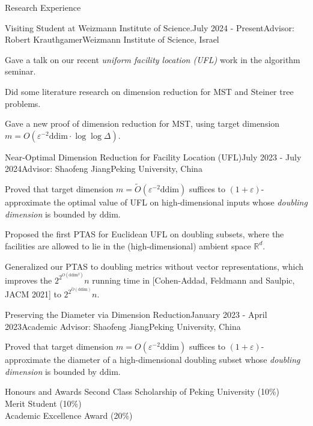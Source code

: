 \documentclass{resume} %
\begin{document}
\begin{rSection}{Research Experience}{}
    \begin{rSubsection}{Visiting Student at Weizmann Institute of Science.}{July 2024 - Present}{Advisor: Robert Krauthgamer}{Weizmann Institute of Science, Israel}
        \item Gave a talk on our recent \emph{uniform facility location (UFL)} work in the algorithm seminar.
        \item Did some literature research on dimension reduction for MST and Steiner tree problems.
        \item Gave a new proof of dimension reduction for MST, using target dimension $m = O(\varepsilon^{-2} \mathrm{ddim} \cdot \log\log \Delta)$.
    \end{rSubsection}

    \begin{rSubsection}{Near-Optimal Dimension Reduction for Facility Location (UFL)}{July 2023 - July 2024}{Advisor: Shaofeng Jiang}{Peking University, China}
       \item Proved that target dimension $m = \tilde{O}(\varepsilon^{-2} \mathrm{ddim})$ suffices to $(1+\varepsilon)$-approximate the optimal value of UFL on high-dimensional inputs whose \emph{doubling dimension} is bounded by $\mathrm{ddim}$.
       \item Proposed the first PTAS for Euclidean UFL on doubling subsets, where the facilities are allowed to lie in the (high-dimensional) ambient space $\mathbb{R}^d$.
       \item Generalized our PTAS to doubling metrics without vector representations, which improves the $2^{2^{O(\mathrm{ddim^2})}} n$ running time in [Cohen-Addad, Feldmann and Saulpic, JACM 2021] to $2^{2^{\tilde O(\mathrm{ddim})}} n$.
    \end{rSubsection}

    \begin{rSubsection}{Preserving the Diameter via Dimension Reduction}{January 2023 - April 2023}{Academic Advisor: Shaofeng Jiang}{Peking University, China}
        \item Proved that target dimension $m = O(\varepsilon^{-2} \mathrm{ddim})$ suffices to $(1+\varepsilon)$-approximate the diameter of a high-dimensional doubling subset whose \emph{doubling dimension} is bounded by $\mathrm{ddim}$.
    \end{rSubsection}
\end{rSection}

\begin{rSection}{Honours and Awards}{}
    Second Class Scholarship of Peking University (10\%) 
    \\ Merit Student (10\%) 
    \\ Academic Excellence Award (20\%) 
\end{rSection}
\end{document}

